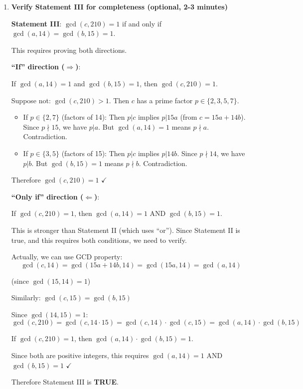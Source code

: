 \documentclass[12pt]{article}
\begin{document}
\begin{solutionbox}
\begin{enumerate}[leftmargin=*]
    \item \textbf{Verify Statement III for completeness (optional, 2-3 minutes)}
    
    \textbf{Statement III}: $\gcd(c,210)=1$ if and only if $\gcd(a,14)=\gcd(b,15)=1$.
    
    This requires proving both directions.
    
    \textbf{``If'' direction ($\Rightarrow$)}: 
    
    If $\gcd(a,14)=1$ and $\gcd(b,15)=1$, then $\gcd(c,210)=1$.
    
    Suppose not: $\gcd(c,210) > 1$. Then $c$ has a prime factor $p \in \{2,3,5,7\}$.
    
    \begin{itemize}
        \item If $p \in \{2,7\}$ (factors of 14): Then $p|c$ implies $p|15a$ (from $c=15a+14b$). Since $p \nmid 15$, we have $p|a$. But $\gcd(a,14)=1$ means $p \nmid a$. Contradiction.
        \item If $p \in \{3,5\}$ (factors of 15): Then $p|c$ implies $p|14b$. Since $p \nmid 14$, we have $p|b$. But $\gcd(b,15)=1$ means $p \nmid b$. Contradiction.
    \end{itemize}
    
    Therefore $\gcd(c,210)=1$ $\checkmark$
    
    \textbf{``Only if'' direction ($\Leftarrow$)}: 
    
    If $\gcd(c,210)=1$, then $\gcd(a,14)=1$ AND $\gcd(b,15)=1$.
    
    This is stronger than Statement II (which uses ``or''). Since Statement II is true, and this requires both conditions, we need to verify.
    
    Actually, we can use GCD property:
    $$\gcd(c,14) = \gcd(15a+14b, 14) = \gcd(15a, 14) = \gcd(a,14)$$
    
    (since $\gcd(15,14)=1$)
    
    Similarly: $\gcd(c,15) = \gcd(b,15)$
    
    Since $\gcd(14,15)=1$:
    $$\gcd(c,210) = \gcd(c,14 \cdot 15) = \gcd(c,14) \cdot \gcd(c,15) = \gcd(a,14) \cdot \gcd(b,15)$$
    
    If $\gcd(c,210)=1$, then $\gcd(a,14) \cdot \gcd(b,15) = 1$.
    
    Since both are positive integers, this requires $\gcd(a,14)=1$ AND $\gcd(b,15)=1$ $\checkmark$
    
    Therefore Statement III is \textbf{TRUE}.
    

\end{enumerate}
\end{solutionbox}
\end{document}
